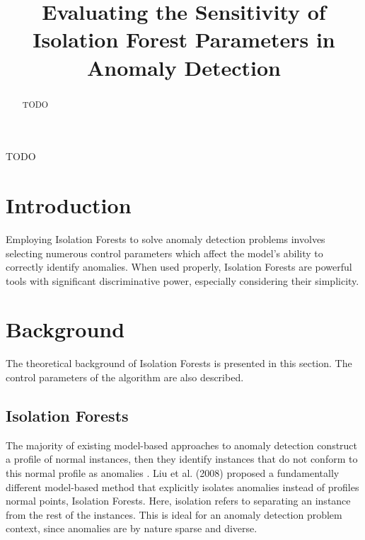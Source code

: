 \documentclass[10pt, conference]{IEEEtran}
\begin{document}
\title{Evaluating the Sensitivity of Isolation Forest Parameters in Anomaly Detection\\

}

\author{
}

\maketitle

\begin{abstract}
TODO
\end{abstract}

\begin{IEEEkeywords}
TODO
\end{IEEEkeywords}

\section{Introduction}
Employing Isolation Forests to solve anomaly detection problems involves selecting numerous control parameters which affect the model's ability to correctly identify anomalies. When used properly, Isolation Forests are powerful tools with significant discriminative power, especially considering their simplicity.





\section{Background}
The theoretical background of Isolation Forests is presented in this section. The control parameters of the algorithm are also described.
\subsection{Isolation Forests}
The majority of existing model-based approaches to anomaly detection construct a profile of normal instances, then they identify instances that do not conform to this normal profile as anomalies \cite{iforest}. Liu et al. (2008) proposed a fundamentally different model-based method that explicitly isolates anomalies instead of profiles normal points, Isolation Forests. Here, isolation refers to separating an instance from the rest of the instances. This is ideal for an anomaly detection problem context, since anomalies are by nature sparse and diverse.
\end{document}
